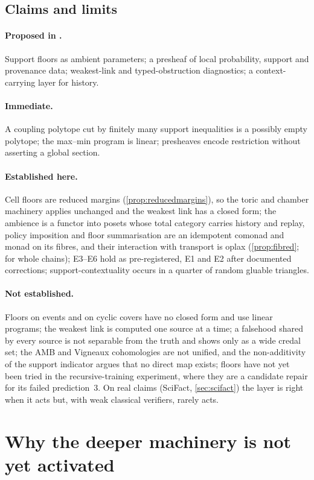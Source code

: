 \documentclass[11pt]{article}
\theoremstyle{definition}
\theoremstyle{remark}
\begin{document}
\subsection{Claims and limits}
\paragraph{Proposed in \cite{SupportAmbience}.} Support floors as ambient parameters; a presheaf of local probability, support and
provenance data; weakest-link and typed-obstruction diagnostics; a context-carrying layer for history.
\paragraph{Immediate.} A coupling polytope cut by finitely many support inequalities is a possibly empty polytope; the max--min
program is linear; presheaves encode restriction without asserting a global section.
\paragraph{Established here.} Cell floors are reduced margins (\cref{prop:reducedmargins}), so the toric and chamber machinery applies
unchanged and the weakest link has a closed form; the ambience is a functor into posets whose total category carries history and
replay, policy imposition and floor summarisation are an idempotent comonad and monad on its fibres, and their interaction with
transport is oplax (\cref{prop:fibred}; \cite[Thm.~10.26]{Tower} for whole chains); E3--E6 hold as pre-registered, E1 and E2 after documented corrections; support-contextuality
occurs in a quarter of random gluable triangles.
\paragraph{Not established.} Floors on events and on cyclic covers have no closed form and use linear programs; the weakest link is
computed one source at a time; a falsehood shared by every source is not separable from the truth and shows only as a wide credal
set; the AMB and Vigneaux cohomologies are not unified, and the non-additivity of the support indicator argues that no direct map
exists; floors have not yet been tried in the recursive-training experiment, where they are a candidate repair for its failed
prediction~3. On real claims (SciFact, \cref{sec:scifact}) the layer is right when it acts but, with weak classical verifiers, rarely acts.

\section{Why the deeper machinery is not yet activated}\label{sec:activation}
\end{document}
